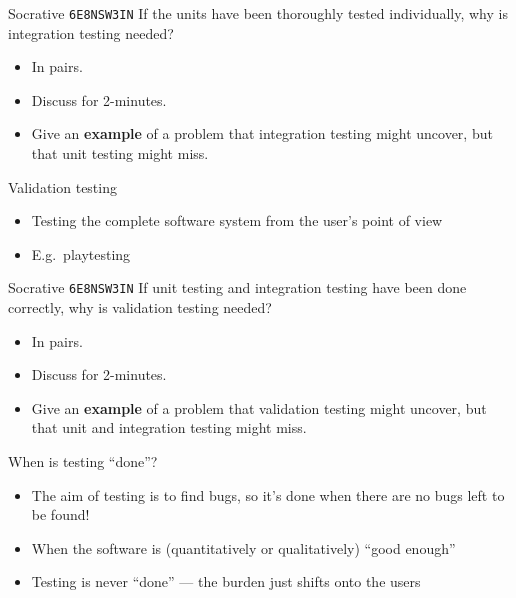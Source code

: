 \begin{frame}{Socrative \texttt{6E8NSW3IN}}
	If the units have been thoroughly tested individually, why is integration testing needed?
	\begin{itemize}
		\item In pairs.
		\item Discuss for 2-minutes.
		\item Give an \textbf{example} of a problem that integration testing might uncover,
            but that unit testing might miss. 
	\end{itemize}
\end{frame}

\begin{frame}{Validation testing}
    \begin{itemize}
        \item Testing the complete software system from the user's point of view \pause
        \item E.g.\ playtesting
    \end{itemize}
\end{frame}

\begin{frame}{Socrative \texttt{6E8NSW3IN}}
	If unit testing and integration testing have been done correctly, why is validation testing needed?
	\begin{itemize}
		\item In pairs.
		\item Discuss for 2-minutes.
		\item Give an \textbf{example} of a problem that validation testing might uncover,
            but that unit and integration testing might miss. 
	\end{itemize}
\end{frame}

\begin{frame}{When is testing ``done''?}
    \begin{itemize}
        \item The aim of testing is to find bugs, so it's done when there are no bugs left to be found! \smiley{} \pause
        \item When the software is (quantitatively or qualitatively) ``good enough'' \pause
        \item Testing is never ``done'' --- the burden just shifts onto the users
    \end{itemize}
\end{frame}

